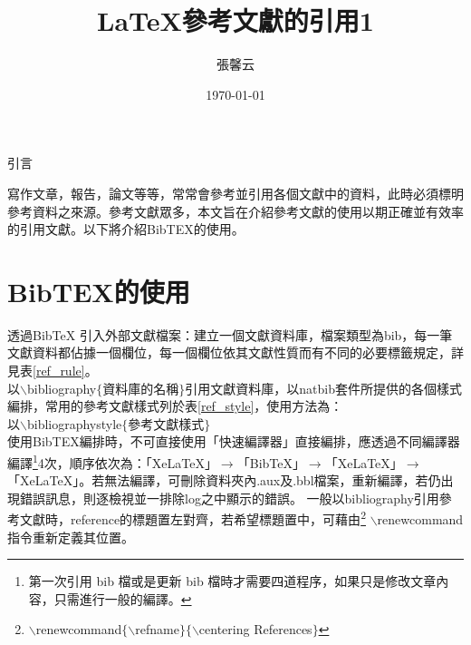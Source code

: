   

\title{ \LaTeX{\UD 參考文獻的引用1}}
\author{{\NC 張馨云}\;\; {}}
\date{{\BR \today}} 	


\maketitle
\fontsize{12}{22 pt}\selectfont

\centerline{{\BCF 引言}}
\setlength{\parindent}{2em}   
	寫作文章，報告，論文等等，常常會參考並引用各個文獻中的資料，此時必須標明參考資料之來源。參考文獻眾多，本文旨在介紹參考文獻的使用以期正確並有效率的引用文獻。以下將介紹BibTEX的使用。\\
\section{{\UD BibTEX的使用}}	
	透過BibTeX 引入外部文獻檔案：建立一個文獻資料庫，檔案類型為bib，每一筆文獻資料都佔據一個欄位，每一個欄位依其文獻性質而有不同的必要標籤規定，詳見表\ref{ref_rule}。 \\
	\indent 以$\backslash$bibliography$\{$資料庫的名稱$\}$引用文獻資料庫，以natbib套件所提供的各個樣式編排，常用的參考文獻樣式列於表\ref{ref_style}，使用方法為：\\
	\indent 以$\backslash$bibliographystyle$\{$參考文獻樣式$\}$ \\
	\indent 使用BibTEX編排時，不可直接使用「快速編譯器」直接編排，應透過不同編譯器編譯\footnote{第一次引用 bib 檔或是更新 bib 檔時才需要四道程序，如果只是修改文章內容，只需進行一般的編譯。}4次，順序依次為：「XeLaTeX」$\longrightarrow$「BibTeX」$\longrightarrow$「XeLaTeX」$\longrightarrow$「XeLaTeX」。若無法編譯，可刪除資料夾內.aux及.bbl檔案，重新編譯，若仍出現錯誤訊息，則逐檢視並一排除log之中顯示的錯誤。
	\indent 一般以bibliography引用參考文獻時，reference的標題置左對齊，若希望標題置中，可藉由\footnote{$\backslash$renewcommand$\{\backslash$refname$\}\{\backslash$centering References$\}$} $\backslash$renewcommand指令重新定義其位置。
	
